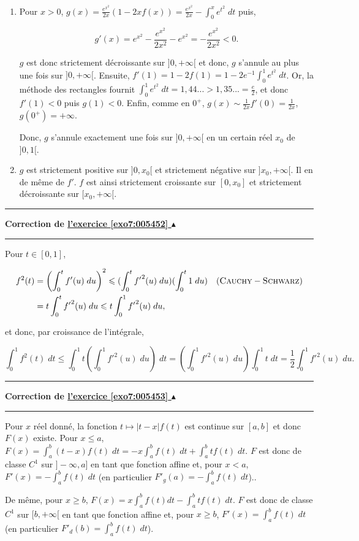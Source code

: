 \documentclass[11pt,a4paper]{article}
\newcounter{exo}
\newcommand{\correction}[1]{\hypertarget{cor7:#1}{}\label{cor7:#1}{\bf Correction de \hyperlink{exo7:#1}{l'exercice \ref{exo7:#1} $\blacktriangle$}}\vspace{1mm}\hrule\vspace{1mm}}
\newcommand{\fincorrection}{\vspace{1mm}\hrule\vspace*{7mm}}
\begin{document}
\begin{enumerate}
\item  Pour $x>0$, $g(x)=\frac{e^{x^2}}{2x}(1-2xf(x))=\frac{e^{x^2}}{2x}-\int_{0}^{x}e^{t^2}\;dt$ puis,

$$g'(x)=e^{x^2}-\frac{e^{x^2}}{2x^2}-e^{x^2}=-\frac{e^{x^2}}{2x^2}<0.$$

$g$ est donc strictement décroissante sur $]0,+\infty[$ et donc, $g$ s'annule au plus une fois sur $]0,+\infty[$. Ensuite, $f'(1)=1-2f(1)=1-2e^{-1}\int_{0}^{1}e^{t^2}\;dt$. Or, la méthode des rectangles fournit $\int_{0}^{1}e^{t^2}\;dt =1,44... >1,35...=\frac{e}{2}$, et donc $f'(1)<0$ puis $g(1)<0$. Enfin, comme en $0^+$, $g(x)\sim\frac{1}{2x}f'(0)=\frac{1}{2x}$, $g(0^+)=+\infty$.

Donc, $g$ s'annule exactement une fois sur $]0,+\infty[$ en un certain réel $x_0$ de $]0,1[$.

\item  $g$ est strictement positive sur $]0,x_0[$ et strictement négative sur $]x_0,+\infty[$. Il en de même de $f'$. $f$ est ainsi strictement croissante sur $[0,x_0]$ et strictement décroissante sur $[x_0,+\infty[$.
\end{enumerate}

\fincorrection
\correction{005452}
Pour $t\in[0,1]$,

\begin{align*}\ensuremath
f^2(t)&=\left(\int_{0}^{t}f'(u)\;du\right)^2\leq(\int_{0}^{t}{f'}^2(u)\;du)(\int_{0}^{t}1\;du)\quad(\textsc{Cauchy}-\textsc{Schwarz})\\
 &=t\int_{0}^{t}{f'}^2(u)\;du\leq t\int_{0}^{1}{f'}^2(u)\;du,
\end{align*}
 
et donc, par croissance de l'intégrale,

$$\int_{0}^{1}f^2(t)\;dt\leq\int_{0}^{1}t(\int_{0}^{1}{f'}^2(u)\;du)\;dt=(\int_{0}^{1}{f'}^2(u)\;du)\int_{0}^{1}t\;dt=\frac{1}{2}\int_{0}^{1}{f'}^2(u)\;du.$$
\fincorrection
\correction{005453}
Pour $x$ réel donné, la fonction $t\mapsto|t-x|f(t)$ est continue sur $[a,b]$ et donc $F(x)$ existe. Pour $x\leq a$,
$F(x)=\int_{a}^{b}(t-x)f(t)\;dt=-x\int_{a}^{b}f(t)\;dt+\int_{a}^{b}tf(t)\;dt$. $F$ est donc de classe $C^1$ sur $]-\infty,a]$ en tant que fonction affine et, pour $x<a$, $F'(x)=-\int_{a}^{b}f(t)\;dt$ (en particulier $F'_g(a)=-\int_{a}^{b}f(t)\;dt$)..

De même, pour $x\geq b$, $F(x)=x\int_{a}^{b}f(t)dt-\int_{a}^{b}tf(t)\;dt$. $F$ est donc de classe $C^1$ sur $[b,+\infty[$ en tant que fonction affine et, pour $x\geq b$, $F'(x)=\int_{a}^{b}f(t)\;dt$ (en particulier $F'_d(b)=\int_{a}^{b}f(t)\;dt$).
\end{document}
